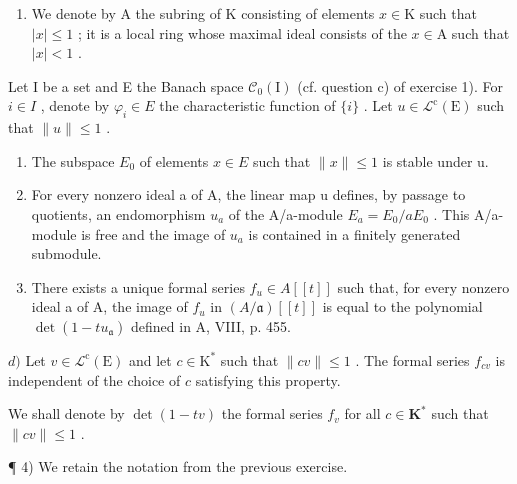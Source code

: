 \begin{enumerate}
\def\labelenumi{\arabic{enumi})}
\setcounter{enumi}{2}
\tightlist
\item
  We denote by A the subring of K consisting of elements \(x \in \mathrm{K}\) such that \(|x| \leqslant 1\) ; it is a local ring whose maximal ideal consists of the \(x \in \mathrm{A}\) such that \(|x| < 1\) .
\end{enumerate}

Let I be a set and E the Banach space \(\mathcal{C}_{0}(\mathrm{I})\) (cf. question c) of exercise 1). For \(i \in I\) , denote by \(\varphi_{i} \in E\) the characteristic function of \(\{i\}\) . Let \(u \in \mathcal{L}^{\mathrm{c}}(\mathrm{E})\) such that \(\|u\| \leqslant 1\) .

\begin{enumerate}
\def\labelenumi{\alph{enumi})}
\item
  The subspace \(E_{0}\) of elements \(x \in E\) such that \(\|x\| \leqslant 1\) is stable under u.
\item
  For every nonzero ideal a of A, the linear map u defines, by passage to quotients, an endomorphism \(u_{a}\) of the A/a-module \(E_{a} = E_{0}/aE_{0}\) . This A/a-module is free and the image of \(u_{a}\) is contained in a finitely generated submodule.
\item
  There exists a unique formal series \(f_{u} \in A[[t]]\) such that, for every nonzero ideal a of A, the image of \(f_{u}\) in \((A/\mathfrak{a})[[t]]\) is equal to the polynomial \(\det(1 - tu_{\mathfrak{a}})\) defined in A, VIII, p. 455.
\end{enumerate}

\(d)\) Let \(v \in \mathcal{L}^{\mathrm{c}}(\mathrm{E})\) and let \(c \in \mathrm{K}^{*}\) such that \(\|cv\| \leqslant 1\) . The formal series \(f_{cv}\) is independent of the choice of \(c\) satisfying this property.

We shall denote by \(\det(1-tv)\) the formal series \(f_v\) for all \(c \in \mathbf{K}^*\) such that \(\|cv\| \leqslant 1\) .

¶ 4) We retain the notation from the previous exercise.


